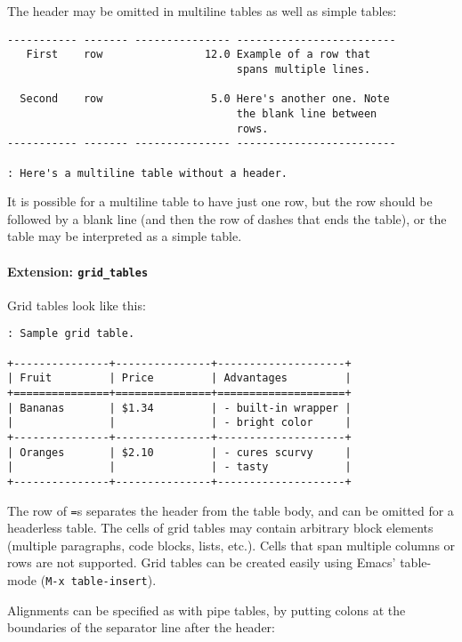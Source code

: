 \documentclass[]{article}
\begin{document}
The header may be omitted in multiline tables as well as simple tables:

\begin{verbatim}
----------- ------- --------------- -------------------------
   First    row                12.0 Example of a row that
                                    spans multiple lines.

  Second    row                 5.0 Here's another one. Note
                                    the blank line between
                                    rows.
----------- ------- --------------- -------------------------

: Here's a multiline table without a header.
\end{verbatim}

It is possible for a multiline table to have just one row, but the row
should be followed by a blank line (and then the row of dashes that ends
the table), or the table may be interpreted as a simple table.

\hypertarget{extension-grid_tables}{%
\paragraph{\texorpdfstring{Extension:
\texttt{grid\_tables}}{Extension: grid\_tables}}\label{extension-grid_tables}}

Grid tables look like this:

\begin{verbatim}
: Sample grid table.

+---------------+---------------+--------------------+
| Fruit         | Price         | Advantages         |
+===============+===============+====================+
| Bananas       | $1.34         | - built-in wrapper |
|               |               | - bright color     |
+---------------+---------------+--------------------+
| Oranges       | $2.10         | - cures scurvy     |
|               |               | - tasty            |
+---------------+---------------+--------------------+
\end{verbatim}

The row of \texttt{=}s separates the header from the table body, and can
be omitted for a headerless table. The cells of grid tables may contain
arbitrary block elements (multiple paragraphs, code blocks, lists,
etc.). Cells that span multiple columns or rows are not supported. Grid
tables can be created easily using Emacs' table-mode
(\texttt{M-x\ table-insert}).

Alignments can be specified as with pipe tables, by putting colons at
the boundaries of the separator line after the header:
\end{document}
